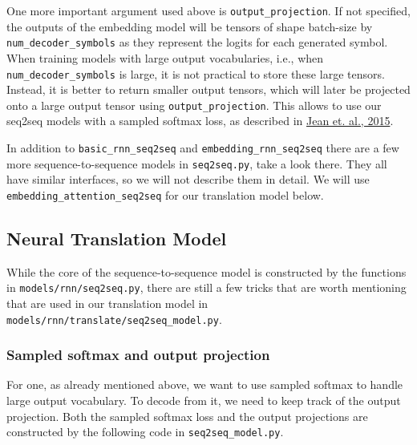 One more important argument used above is \texttt{output\_projection}.
If not specified, the outputs of the embedding model will be tensors of
shape batch-size by \texttt{num\_decoder\_symbols} as they represent the
logits for each generated symbol. When training models with large output
vocabularies, i.e., when \texttt{num\_decoder\_symbols} is large, it is
not practical to store these large tensors. Instead, it is better to
return smaller output tensors, which will later be projected onto a
large output tensor using \texttt{output\_projection}. This allows to
use our seq2seq models with a sampled softmax loss, as described in
\href{http://arxiv.org/pdf/1412.2007v2.pdf}{Jean et. al., 2015}.

In addition to \texttt{basic\_rnn\_seq2seq} and
\texttt{embedding\_rnn\_seq2seq} there are a few more
sequence-to-sequence models in \texttt{seq2seq.py}, take a look there.
They all have similar interfaces, so we will not describe them in
detail. We will use \texttt{embedding\_attention\_seq2seq} for our
translation model below.

\subsection{Neural Translation Model }\label{neural-translation-model}

While the core of the sequence-to-sequence model is constructed by the
functions in \texttt{models/rnn/seq2seq.py}, there are still a few
tricks that are worth mentioning that are used in our translation model
in \texttt{models/rnn/translate/seq2seq\_model.py}.

\subsubsection{Sampled softmax and output projection
}\label{sampled-softmax-and-output-projection}

For one, as already mentioned above, we want to use sampled softmax to
handle large output vocabulary. To decode from it, we need to keep track
of the output projection. Both the sampled softmax loss and the output
projections are constructed by the following code in
\texttt{seq2seq\_model.py}.

